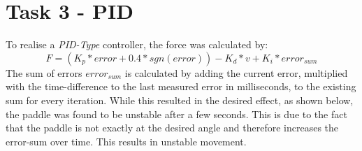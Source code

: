   \section*{Task 3 - PID}

  To realise a \textit{PID-Type} controller, the force was calculated by:
  \begin{equation*}
    F = (K_p * error + 0.4 * sgn(error)) - K_d * v + K_i * error_{sum}
  \end{equation*}
  The sum of errors $error_{sum}$ is calculated by adding the current error, multiplied with the time-difference to the last measured error in milliseconds, to the existing sum for every iteration. While this resulted in the desired effect, as shown below, the paddle was found to be unstable after a few seconds. This is due to the fact that the paddle is not exactly at the desired angle and therefore increases the error-sum over time. This results in unstable movement.

  \begin{figure}[H]
    \centering
  \end{figure}

